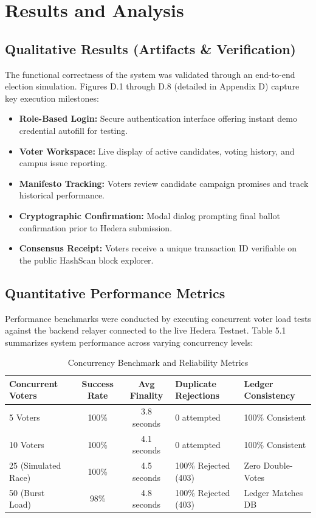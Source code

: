 \documentclass[12pt, a4paper]{article}
\begin{document}
\section{Results and Analysis}

\subsection{Qualitative Results (Artifacts \& Verification)}
The functional correctness of the system was validated through an end-to-end election simulation. Figures D.1 through D.8 (detailed in Appendix D) capture key execution milestones:
\begin{itemize}[leftmargin=*]
    \item \textbf{Role-Based Login:} Secure authentication interface offering instant demo credential autofill for testing.
    \item \textbf{Voter Workspace:} Live display of active candidates, voting history, and campus issue reporting.
    \item \textbf{Manifesto Tracking:} Voters review candidate campaign promises and track historical performance.
    \item \textbf{Cryptographic Confirmation:} Modal dialog prompting final ballot confirmation prior to Hedera submission.
    \item \textbf{Consensus Receipt:} Voters receive a unique transaction ID verifiable on the public HashScan block explorer.
\end{itemize}

\subsection{Quantitative Performance Metrics}
Performance benchmarks were conducted by executing concurrent voter load tests against the backend relayer connected to the live Hedera Testnet. Table 5.1 summarizes system performance across varying concurrency levels:

\begin{table}[H]
    \centering
    \caption{Concurrency Benchmark and Reliability Metrics}
    \label{tab:concurrency}
    \begin{tabularx}{\textwidth}{@{}l c c X X@{}}
        \toprule
        \textbf{Concurrent Voters} & \textbf{Success Rate} & \textbf{Avg Finality} & \textbf{Duplicate Rejections} & \textbf{Ledger Consistency} \\
        \midrule
        5 Voters & 100\% & 3.8 seconds & 0 attempted & 100\% Consistent \\
        10 Voters & 100\% & 4.1 seconds & 0 attempted & 100\% Consistent \\
        25 (Simulated Race) & 100\% & 4.5 seconds & 100\% Rejected (403) & Zero Double-Votes \\
        50 (Burst Load) & 98\% & 4.8 seconds & 100\% Rejected (403) & Ledger Matches DB \\
        \bottomrule
    \end{tabularx}
\end{table}
\end{document}
